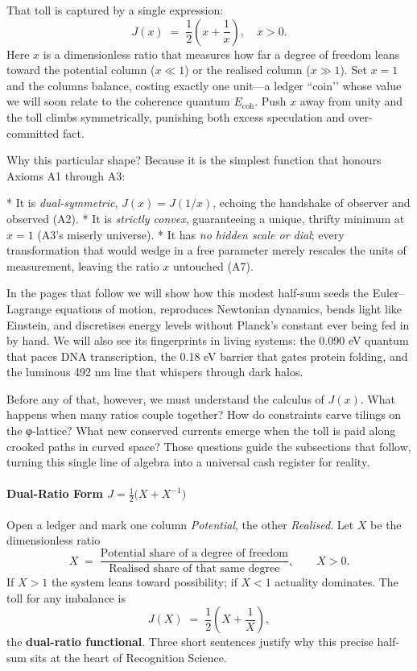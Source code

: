 \documentclass[11pt,oneside]{book}
\newcommand{\Eoh}{\ensuremath{E_{\text{coh}}}}       %
\begin{document}
That toll is captured by a single expression:
\[
  J(x) \;=\; \frac12\!\left(x + \frac1x\right),
  \quad x>0 .
\]
Here \(x\) is a dimensionless ratio that measures how far a degree of freedom leans toward the potential column (\(x\ll 1\)) or the realised column (\(x\gg 1\)).  
Set \(x=1\) and the columns balance, costing exactly one unit—a ledger “coin’’ whose value we will soon relate to the coherence quantum \(\Eoh\).  
Push \(x\) away from unity and the toll climbs symmetrically, punishing both excess speculation and over-committed fact.  

Why this particular shape?  
Because it is the simplest function that honours Axioms A1 through A3:

* It is \emph{dual-symmetric}, \(J(x)=J(1/x)\), echoing the handshake of observer and observed (A2).  
* It is \emph{strictly convex}, guaranteeing a unique, thrifty minimum at \(x=1\) (A3’s miserly universe).  
* It has \emph{no hidden scale or dial}; every transformation that would wedge in a free parameter merely rescales the units of measurement, leaving the ratio \(x\) untouched (A7).

In the pages that follow we will show how this modest half-sum seeds the Euler–Lagrange equations of motion, reproduces Newtonian dynamics, bends light like Einstein, and discretises energy levels without Planck’s constant ever being fed in by hand.  
We will also see its fingerprints in living systems: the 0.090 eV quantum that paces DNA transcription, the 0.18 eV barrier that gates protein folding, and the luminous 492 nm line that whispers through dark halos.  

Before any of that, however, we must understand the calculus of \(J(x)\).  
What happens when many ratios couple together?  
How do constraints carve tilings on the φ-lattice?  
What new conserved currents emerge when the toll is paid along crooked paths in curved space?  
Those questions guide the subsections that follow, turning this single line of algebra into a universal cash register for reality.

\paragraph{Dual-Ratio Form \texorpdfstring{$\displaystyle
J=\tfrac12\!\bigl(X+X^{-1}\bigr)$}{J = 1/2 (X + X^{-1})}}
\label{ssec:dual-ratio-form}

Open a ledger and mark one column \emph{Potential}, the other
\emph{Realised}.  
Let $X$ be the dimensionless ratio
\[
  X
  \;=\;
  \frac{\text{Potential share of a degree of freedom}}
       {\text{Realised share of that same degree}},
  \qquad
  X>0 .
\]
If $X>1$ the system leans toward possibility; if $X<1$ actuality
dominates.  
The toll for any imbalance is
\[
  J(X)
  \;=\;
  \frac12\!\left(X + \frac1X\right),
\]
the \textbf{dual-ratio functional}.  
Three short sentences justify why this precise half-sum sits at the
heart of Recognition Science.
\end{document}
